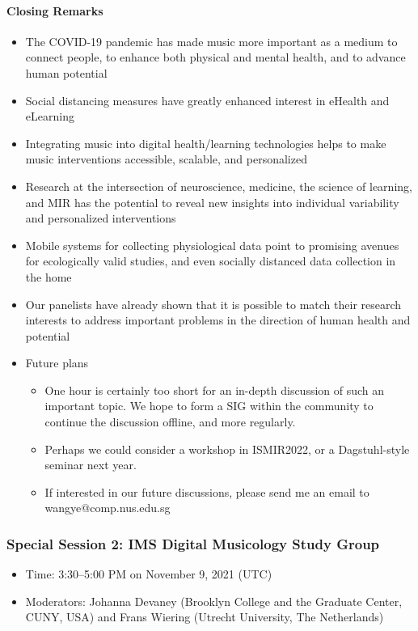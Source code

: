 \documentclass[%
10pt,								%
titlepage,						%
]
{scrartcl}
\begin{document}
        \paragraph{Closing Remarks}
        \begin{itemize}
            \item   The COVID-19 pandemic has made music more important as a medium to connect people, to enhance both physical and mental health, and to advance human potential
            \item   Social distancing measures have greatly enhanced interest in eHealth and eLearning
            \item   Integrating music into digital health/learning technologies helps to make music interventions accessible, scalable, and personalized
            \item   Research at the intersection of neuroscience, medicine, the science of learning, and MIR has the potential to reveal new insights into individual variability and personalized interventions
            \item   Mobile systems for collecting physiological data point to promising avenues for ecologically valid studies, and even socially distanced data collection in the home
            \item   Our panelists have already shown that it is possible to match their research interests to address important problems in the direction of human health and potential
            \item   Future plans
                \begin{itemize}
                    \item   One hour is certainly too short for an in-depth discussion of such an important topic. We hope to form a SIG within the community to continue the discussion offline, and more regularly.
                    \item   Perhaps we could consider a workshop in ISMIR2022, or a Dagstuhl-style seminar next year.
                    \item   If interested in our future discussions, please send me an email to wangye@comp.nus.edu.sg

                \end{itemize}
        \end{itemize}
        
 
        \subsubsection{Special Session 2: IMS Digital Musicology Study Group}
        \begin{itemize}
            \item   Time: 3:30--5:00 PM on November 9, 2021 (UTC)

            \item   Moderators: Johanna Devaney (Brooklyn College and the Graduate Center, CUNY, USA) and Frans Wiering (Utrecht University, The Netherlands)
        \end{itemize}
\end{document}
